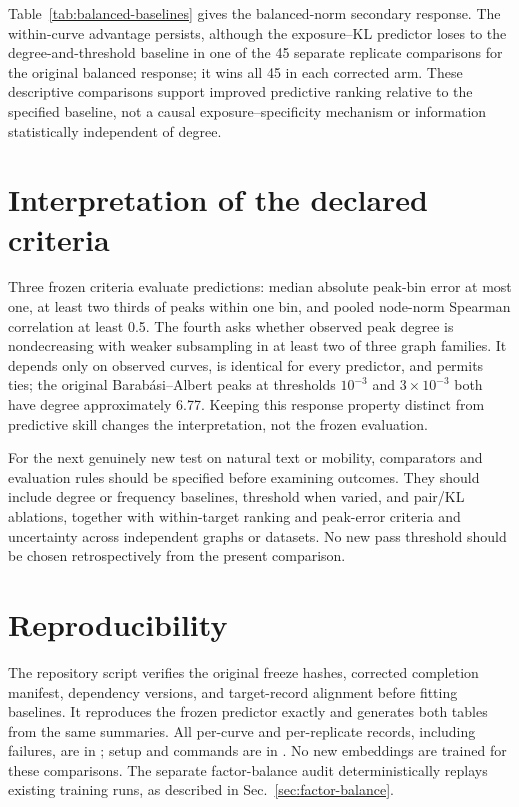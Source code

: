 \documentclass[aps,pre,onecolumn,10pt,superscriptaddress]{revtex4-2}
\begin{document}


Table~\ref{tab:balanced-baselines} gives the balanced-norm secondary response.
The within-curve advantage persists, although the exposure--KL predictor loses to the degree-and-threshold baseline in one of the 45 separate replicate comparisons for the original balanced response; it wins all 45 in each corrected arm.
These descriptive comparisons support improved predictive ranking relative to the specified baseline, not a causal exposure--specificity mechanism or information statistically independent of degree.



\section{Interpretation of the declared criteria}
\label{sec:criteria}

Three frozen criteria evaluate predictions: median absolute peak-bin error at most one, at least two thirds of peaks within one bin, and pooled node-norm Spearman correlation at least 0.5.
The fourth asks whether observed peak degree is nondecreasing with weaker subsampling in at least two of three graph families.
It depends only on observed curves, is identical for every predictor, and permits ties; the original Barab\'asi--Albert peaks at thresholds \(10^{-3}\) and \(3\times10^{-3}\) both have degree approximately 6.77.
Keeping this response property distinct from predictive skill changes the interpretation, not the frozen evaluation.

For the next genuinely new test on natural text or mobility, comparators and evaluation rules should be specified before examining outcomes.
They should include degree or frequency baselines, threshold when varied, and pair/KL ablations, together with within-target ranking and peak-error criteria and uncertainty across independent graphs or datasets.
No new pass threshold should be chosen retrospectively from the present comparison.



\section{Reproducibility}

The repository script  verifies the original freeze hashes, corrected completion manifest, dependency versions, and target-record alignment before fitting baselines.
It reproduces the frozen predictor exactly and generates both tables from the same summaries.
All per-curve and per-replicate records, including failures, are in ; setup and commands are in .
No new embeddings are trained for these comparisons.
The separate factor-balance audit deterministically replays existing training runs, as described in Sec.~\ref{sec:factor-balance}.


\end{document}
